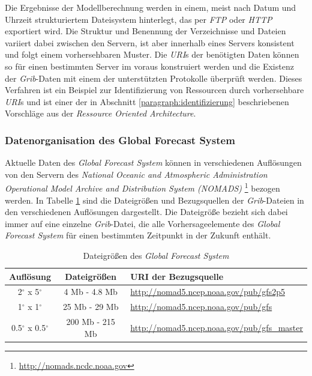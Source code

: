Die Ergebnisse der Modellberechnung werden in einem, meist nach Datum
und Uhrzeit strukturiertem Dateisystem hinterlegt, das per
\textit{FTP} oder \textit{HTTP} exportiert wird. Die Struktur und
Benennung der Verzeichnisse und Dateien variiert dabei zwischen den
Servern, ist aber innerhalb eines Servers konsistent und folgt einem
vorhersehbaren Muster. Die \textit{URI}s der benötigten Daten können
so für einen bestimmten Server im voraus konstruiert werden und die
Existenz der \textit{Grib}-Daten mit einem der unterstützten
Protokolle überprüft werden. Dieses Verfahren ist ein Beispiel zur
Identifizierung von Ressourcen durch vorhersehbare \textit{URI}s und
ist einer der in Abschnitt \ref{paragraph:identifizierung}
beschriebenen Vorschläge aus der \textit{Ressource Oriented
  Architecture}.

\subsubsection{Datenorganisation des Global Forecast System}
Aktuelle Daten des \textit{Global Forecast System} können in
verschiedenen Auflösungen von den Servern des \textit{National Oceanic
  and Atmospheric Administration Operational Model Archive and
  Distribution System (NOMADS)} 
\footnote{\url{http://nomads.ncdc.noaa.gov}} bezogen werden. In
Tabelle \ref{tab:gfs_auflösungen} sind die Dateigrößen und
Bezugsquellen der \textit{Grib}-Dateien in den verschiedenen
Auflösungen dargestellt. Die Dateigröße bezieht sich dabei immer auf
eine einzelne \textit{Grib}-Datei, die alle Vorhersageelemente des
\textit{Global Forecast System} für einen bestimmten Zeitpunkt in der
Zukunft enthält.

\begin{table}[h]
  \centering
  {\sf
    \footnotesize
    \begin{longtable}{@{}ccl}

      \toprule
      \textbf{Auflösung} & \textbf{Dateigrößen} & \textbf{URI der Bezugsquelle} \\

      \midrule

      2$^{\circ}$ x 5$^{\circ}$ & 4 Mb - 4.8 Mb & \url{http://nomad5.ncep.noaa.gov/pub/gfs2p5} \\
      1$^{\circ}$ x 1$^{\circ}$ & 25 Mb - 29 Mb & \url{http://nomad5.ncep.noaa.gov/pub/gfs} \\
      0.5$^{\circ}$ x 0.5$^{\circ}$ & 200 Mb - 215 Mb & \url{http://nomad5.ncep.noaa.gov/pub/gfs_master} \\

      \bottomrule

    \end{longtable}
  }

  \caption{Dateigrößen des \textit{Global Forecast System}}
  \label{tab:gfs_auflösungen}

\end{table}

